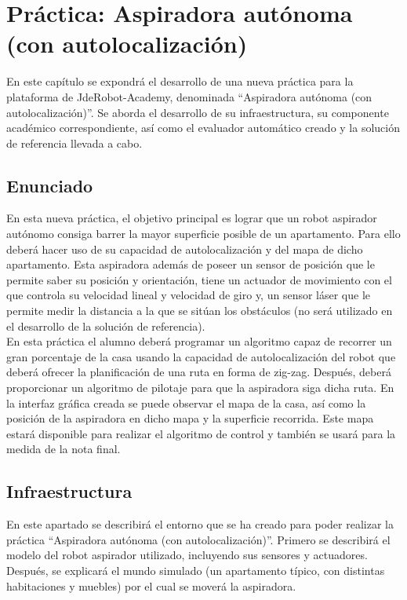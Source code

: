 \chapter{Práctica: Aspiradora autónoma (con autolocalización)}\label{cap.roomba}
En este capítulo se expondrá el desarrollo de una nueva práctica para la plataforma de JdeRobot-Academy, denominada ``Aspiradora autónoma (con autolocalización)''. Se aborda el desarrollo de su infraestructura, su componente académico correspondiente, así como el evaluador automático creado y la solución de referencia llevada a cabo. 

\section{Enunciado} \label{sec.enunciado}
En esta nueva práctica, el objetivo principal es lograr que un robot aspirador autónomo consiga barrer la mayor superficie posible de un apartamento. Para ello deberá hacer uso de su capacidad de autolocalización y del mapa de dicho apartamento. Esta aspiradora además de poseer un sensor de posición que le permite saber su posición y orientación, tiene un actuador de movimiento con el que controla su velocidad lineal y velocidad de giro y, un sensor láser que le permite medir la distancia a la que se sitúan los obstáculos (no será utilizado en el desarrollo de la solución de referencia). \\

En esta práctica el alumno deberá programar un algoritmo capaz de recorrer un gran porcentaje de la casa usando la capacidad de autolocalización del robot que deberá ofrecer la planificación de una ruta en forma de zig-zag. Después, deberá proporcionar un algoritmo de pilotaje para que la aspiradora siga dicha ruta. En la interfaz gráfica creada se puede observar el mapa de la casa, así como la posición de la aspiradora en dicho mapa y la superficie recorrida. Este mapa estará disponible para realizar el algoritmo de control y también se usará para la medida de la nota final.

\section{Infraestructura} 
En este apartado se describirá el entorno que se ha creado para poder realizar la práctica ``Aspiradora autónoma (con autolocalización)''. Primero se describirá el modelo del robot aspirador utilizado, incluyendo sus sensores y actuadores. Después, se explicará el mundo simulado (un apartamento típico, con distintas habitaciones y muebles) por el cual se moverá la aspiradora. 


